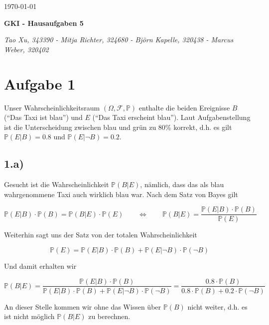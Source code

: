 \documentclass[a4paper]{article}
\newcommand{\IP}{\mathbb{P}}
\newcommand{\F}{\mathscr{F}}
\begin{document}
  \begin{flushright}
    \today
  \end{flushright}
  \begin{center}
    \Large\textbf{{GKI - Hausaufgaben 5}}\\
  \end{center}

  \begin{center}
        \large\textsl{Tao Xu, 343390 - Mitja Richter, 324680 - Björn Kapelle, 320438 - Marcus Weber, 320402}\\
  \end{center}
  
\section*{Aufgabe 1}
Unser Wahrscheinlichkeitsraum $(\Omega, \F, \IP)$ enthalte die beiden Ereignisse $B$ ("`Das Taxi ist blau"') und $E$ ("`Das Taxi erscheint blau"'). Laut Aufgabenstellung ist die Unterscheidung zwischen blau und gr\"un zu 80\% korrekt, d.h. es gilt $\IP(E|B)=0.8$ und $\IP(E|\neg B)=0.2$.

\subsection*{1.a)}
Gesucht ist die Wahrscheinlichkeit $\IP(B|E)$, n\"amlich, dass das als blau wahrgenommene Taxi auch wirklich blau war. Nach dem Satz von Bayes gilt

\begin{displaymath}
	 \IP(E|B) \cdot \IP(B) = \IP(B|E) \cdot \IP(E) \qquad \Leftrightarrow	\qquad \IP(B|E) = \frac{\IP(E|B) \cdot \IP(B)}{\IP(E)}
\end{displaymath}

Weiterhin sagt uns der Satz von der totalen Wahrscheinlichkeit

\begin{displaymath}
	\IP(E) = \IP(E|B) \cdot \IP(B) + \IP(E|\neg B) \cdot \IP(\neg B) 
\end{displaymath}

Und damit erhalten wir

\begin{displaymath}
	\IP(B|E) = \frac{\IP(E|B) \cdot \IP(B)}{\IP(E|B) \cdot \IP(B) + \IP(E|\neg B) \cdot \IP(\neg B)} = \frac{0.8 \cdot \IP(B)}{0.8 \cdot \IP(B) + 0.2 \cdot \IP(\neg B)}
\end{displaymath}

An dieser Stelle kommen wir ohne das Wissen \"uber $\IP(B)$ nicht weiter, d.h. es ist nicht m\"oglich $\IP(B|E)$ zu berechnen.
\end{document}
